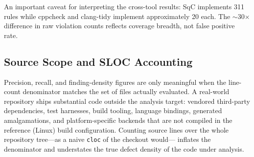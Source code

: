 An important caveat for interpreting the cross-tool results: SqC
implements 311 rules while cppcheck and clang-tidy implement
approximately 20 each.  The $\sim$30$\times$ difference in raw
violation counts reflects coverage breadth, not false positive rate.

\subsection{Source Scope and SLOC Accounting}
\label{sec:sloc-scope}

Precision, recall, and finding-density figures are only meaningful when
the line-count denominator matches the set of files actually evaluated.
A real-world repository ships substantial code outside the analysis
target: vendored third-party dependencies, test harnesses, build
tooling, language bindings, generated amalgamations, and
platform-specific backends that are not compiled in the reference
(Linux) build configuration.  Counting source lines over the whole
repository tree---as a naive \texttt{cloc} of the checkout would---
inflates the denominator and understates the true defect density of the
code under analysis.

